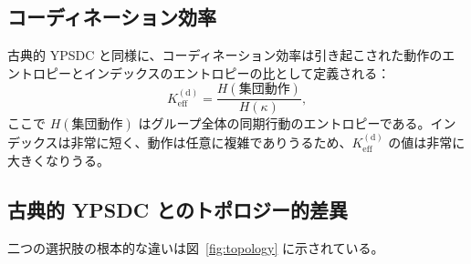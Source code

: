 \documentclass[11pt,a4paper]{article}
\newcommand{\Keff}{K_{\mathrm{eff}}}
\begin{document}
	\subsection{コーディネーション効率}
	
	古典的 YPSDC と同様に、コーディネーション効率は引き起こされた動作のエントロピーとインデックスのエントロピーの比として定義される：
	\begin{equation}
		\Keff^{\mathrm{(d)}} = \frac{H(\text{集団動作})}{H(\kappa)},
		\label{eq:Keff_d}
	\end{equation}
	ここで \(H(\text{集団動作})\) はグループ全体の同期行動のエントロピーである。インデックスは非常に短く、動作は任意に複雑でありうるため、\(\Keff^{\mathrm{(d)}}\) の値は非常に大きくなりうる。
	
	\subsection{古典的 YPSDC とのトポロジー的差異}
	
	二つの選択肢の根本的な違いは図~\ref{fig:topology} に示されている。
	
\end{document}
